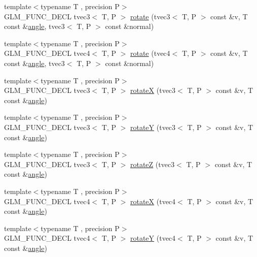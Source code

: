 \begin{DoxyCompactItemize}
\item 
{\footnotesize template$<$typename T , precision P$>$ }\\G\+L\+M\+\_\+\+F\+U\+N\+C\+\_\+\+D\+E\+C\+L tvec3$<$ T, P $>$ \hyperlink{group__gtx__rotate__vector_ga526b6f8995bc0946aa1a04e9297de7c6}{rotate} (tvec3$<$ T, P $>$ const \&v, T const \&\hyperlink{group__gtc__quaternion_gad4a4448baedb198b2b1e7880d2544dc9}{angle}, tvec3$<$ T, P $>$ const \&normal)
\item 
{\footnotesize template$<$typename T , precision P$>$ }\\G\+L\+M\+\_\+\+F\+U\+N\+C\+\_\+\+D\+E\+C\+L tvec4$<$ T, P $>$ \hyperlink{group__gtx__rotate__vector_gaf4d59dd2f668f9ffb38048055d1316bd}{rotate} (tvec4$<$ T, P $>$ const \&v, T const \&\hyperlink{group__gtc__quaternion_gad4a4448baedb198b2b1e7880d2544dc9}{angle}, tvec3$<$ T, P $>$ const \&normal)
\item 
{\footnotesize template$<$typename T , precision P$>$ }\\G\+L\+M\+\_\+\+F\+U\+N\+C\+\_\+\+D\+E\+C\+L tvec3$<$ T, P $>$ \hyperlink{group__gtx__rotate__vector_ga0c2dc9f8507bffcbb957db9818b18508}{rotate\+X} (tvec3$<$ T, P $>$ const \&v, T const \&\hyperlink{group__gtc__quaternion_gad4a4448baedb198b2b1e7880d2544dc9}{angle})
\item 
{\footnotesize template$<$typename T , precision P$>$ }\\G\+L\+M\+\_\+\+F\+U\+N\+C\+\_\+\+D\+E\+C\+L tvec3$<$ T, P $>$ \hyperlink{group__gtx__rotate__vector_gabb5d19eba5befeebcb35a0aad4a114e3}{rotate\+Y} (tvec3$<$ T, P $>$ const \&v, T const \&\hyperlink{group__gtc__quaternion_gad4a4448baedb198b2b1e7880d2544dc9}{angle})
\item 
{\footnotesize template$<$typename T , precision P$>$ }\\G\+L\+M\+\_\+\+F\+U\+N\+C\+\_\+\+D\+E\+C\+L tvec3$<$ T, P $>$ \hyperlink{group__gtx__rotate__vector_gae30ac01b89d4f16a972fee696c964908}{rotate\+Z} (tvec3$<$ T, P $>$ const \&v, T const \&\hyperlink{group__gtc__quaternion_gad4a4448baedb198b2b1e7880d2544dc9}{angle})
\item 
{\footnotesize template$<$typename T , precision P$>$ }\\G\+L\+M\+\_\+\+F\+U\+N\+C\+\_\+\+D\+E\+C\+L tvec4$<$ T, P $>$ \hyperlink{group__gtx__rotate__vector_gadab312d430a564741ae02215255027a0}{rotate\+X} (tvec4$<$ T, P $>$ const \&v, T const \&\hyperlink{group__gtc__quaternion_gad4a4448baedb198b2b1e7880d2544dc9}{angle})
\item 
{\footnotesize template$<$typename T , precision P$>$ }\\G\+L\+M\+\_\+\+F\+U\+N\+C\+\_\+\+D\+E\+C\+L tvec4$<$ T, P $>$ \hyperlink{group__gtx__rotate__vector_gae2507577c4bffa3548b32852791dd90c}{rotate\+Y} (tvec4$<$ T, P $>$ const \&v, T const \&\hyperlink{group__gtc__quaternion_gad4a4448baedb198b2b1e7880d2544dc9}{angle})

\end{DoxyCompactItemize}
